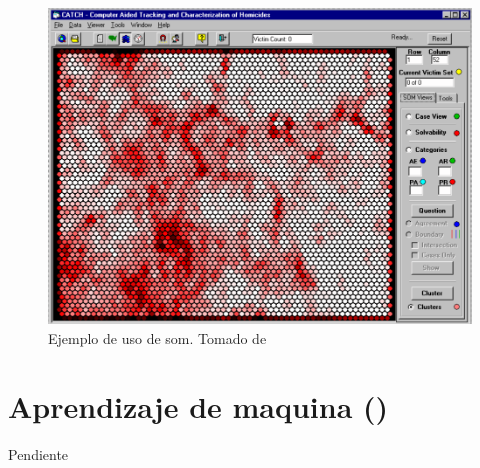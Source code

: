 \begin{figure}[th]
\centering
\includegraphics[scale=0.3]{Figures/som-example.png}
\decoRule
\caption[Ejemplo de uso de \gls{som}]{Ejemplo de uso de \gls{som}. Tomado de \cite{mena2003investigative}}
\label{fig:som-adap-proc}
\end{figure}


\section{Aprendizaje de maquina ()} \label{secML}
Pendiente